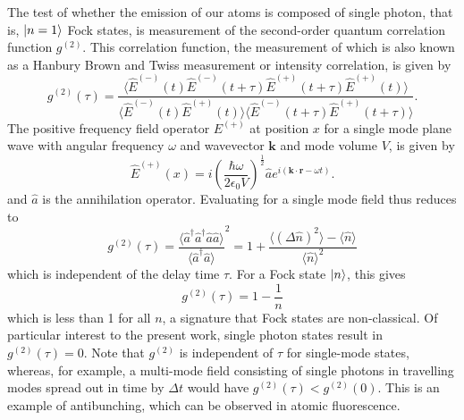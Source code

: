 The test of whether the emission of our atoms is composed of single photon, that is, $\ket{n=1}$ Fock states, is measurement of the second-order quantum correlation function $g^{(2)}$. This correlation function, the measurement of which is also known as a Hanbury Brown and Twiss measurement\cite{brown1958interferometry} or intensity correlation, is given by\cite{gerry2004introductory}
\begin{equation}\label{fig:g2long}
    g^{(2)}(\tau) = \frac{\langle \hat{E}^{(-)}(t) \hat{E}^{(-)}(t+\tau) \hat{E}^{(+)}(t+\tau) \hat{E}^{(+)}(t) \rangle}{\langle \hat{E}^{(-)}(t) \hat{E}^{(+)}(t) \rangle \langle \hat{E}^{(-)}(t+\tau) \hat{E}^{(+)}(t+\tau) \rangle}.
\end{equation}
The positive frequency field operator $E^{(+)}$ at position $x$ for a single mode plane wave with angular frequency $\omega$ and wavevector $\mathbf{k}$ and mode volume $V$, is given by
\begin{equation}\label{fig:Epositive}
    \hat{E}^{(+)}(x) = i \left(\frac{\hbar \omega}{2 \epsilon_0 V}\right)^{\frac{1}{2}} \hat{a} e^{i(\mathbf{k\cdot r} - \omega t)}.
\end{equation}
and $\hat{a}$ is the annihilation operator. Evaluating \label{fig:g2} for a single mode field thus reduces to
\begin{equation}
    g^{(2)}(\tau) = \frac{\langle \hat{a}^{\dagger}\hat{a}^{\dagger}\hat{a}\hat{a} \rangle}{\langle \hat{a}^{\dagger}\hat{a} \rangle}^2 = 1 + \frac{\langle (\Delta \hat{n})^2 \rangle - \langle \hat{n} \rangle}{\langle \hat{n} \rangle^2}
\end{equation}
which is independent of the delay time $\tau$. For a Fock state $\ket{n}$, this gives 
\begin{equation}
    g^{(2)}(\tau) = 1 - \frac{1}{n}
\end{equation}
which is less than 1 for all $n$, a signature that Fock states are non-classical. Of particular interest to the present work, single photon states result in $g^{(2)}(\tau)=0$. Note that $g^{(2)}$ is independent of $\tau$ for single-mode states, whereas, for example, a multi-mode field consisting of single photons in travelling modes spread out in time by $\Delta t$ would have $g^{(2)}(\tau) < g^{(2)}(0)$. This is an example of antibunching, which can be observed in atomic fluorescence\cite{schubert1992photon}.